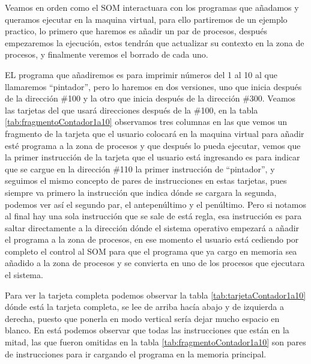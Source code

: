 \documentclass[letterpaper,12pt,oneside]{book}
\begin{document}
		Veamos en orden como el SOM interactuara con los programas que añadamos y queramos ejecutar en la maquina virtual, para ello partiremos
		de un ejemplo practico, lo primero que haremos es añadir un par de procesos, después empezaremos la ejecución, estos tendrán que actualizar
		su contexto en la zona de procesos, y finalmente veremos el borrado de cada uno.
		
		EL programa que añadiremos es para imprimir números del 1 al 10 al que llamaremos ``pintador'', pero lo haremos en dos versiones,  uno que inicia después de la 		
		dirección \#100 y la otro que inicia
		después de la dirección \#300. Veamos las tarjetas del que usará direcciones después de la \#100, en la tabla \ref{tab:fragmentoContador1a10} observamos
		tres columnas en las que vemos un fragmento de la tarjeta que el usuario colocará en la maquina virtual para añadir esté programa a la zona de procesos
		y que después lo pueda ejecutar, vemos que la primer instrucción de la tarjeta que el usuario está ingresando es para indicar que se cargue 
		en la dirección \#110 la primer instrucción de ``pintador'', y seguimos el mismo concepto de pares de instrucciones en estas tarjetas, pues siempre
		va primero la instrucción que indica dónde se cargara la segunda, podemos ver así el segundo par, el antepenúltimo y el penúltimo. Pero
		si notamos al final hay una sola instrucción que se sale de está regla, esa instrucción es para saltar directamente a la dirección
		dónde el sistema operativo empezará a añadir el programa a la zona de procesos,  en ese momento el usuario está cediendo por completo el control
		al SOM para que el programa que ya cargo en memoria sea añadido a la zona de procesos y se convierta en uno de  los procesos que ejecutara el sistema.
		
		Para ver la tarjeta completa podemos observar la tabla \ref{tab:tarjetaContador1a10} dónde está la tarjeta completa, se lee de arriba hacía abajo y de
		izquierda a derecha, puesto que ponerla en modo vertical sería dejar mucho espacio en blanco. En está podemos observar que todas las instrucciones
		que están en la mitad, las que fueron omitidas en la tabla \ref{tab:fragmentoContador1a10} son pares de instrucciones para ir cargando el programa
		en la memoria principal.
				
\end{document}
